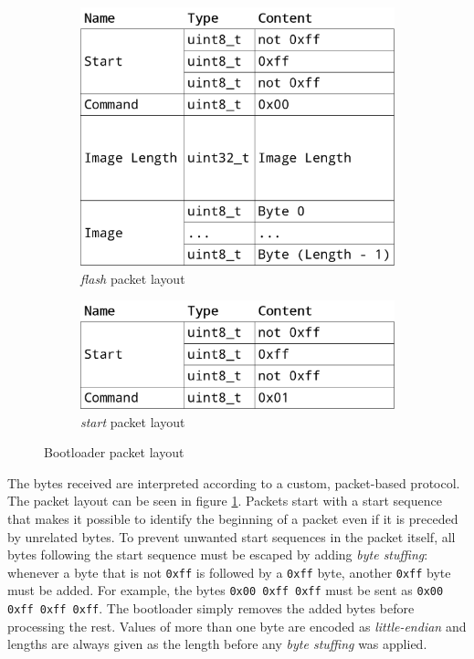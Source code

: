 \begin{figure}[ht]
    \centering

    \begin{subfigure}[t]{0.5\textwidth}
        \centering
        \includegraphics[scale=0.18]{img/bootloader_flash_packet.png}
        \caption{\textit{flash} packet layout}
    \end{subfigure}%
    \begin{subfigure}[t]{0.5\textwidth}
        \centering
        \includegraphics[scale=0.18]{img/bootloader_start_packet.png}
        \caption{\textit{start} packet layout}
    \end{subfigure}

    \caption{Bootloader packet layout}
    \label{implementation/software/bootloader/packet-layout}
\end{figure}

The bytes received are interpreted according to a custom, packet-based protocol. The packet layout
can be seen in figure \ref{implementation/software/bootloader/packet-layout}. Packets start with a
start sequence that makes it possible to identify the beginning of a packet even if it is preceded
by unrelated bytes. To prevent unwanted start sequences in the packet itself, all bytes following
the start sequence must be escaped by adding \textit{byte stuffing}: whenever a byte that is not
\lstinline{0xff} is followed by a \lstinline{0xff} byte, another \lstinline{0xff} byte must be added.
For example, the bytes \lstinline{0x00 0xff 0xff} must be sent as \lstinline{0x00 0xff 0xff 0xff}.
The bootloader simply removes the added bytes before processing the rest. Values of more than one
byte are encoded as \textit{little-endian} and lengths are always given as the length before any
\textit{byte stuffing} was applied.

